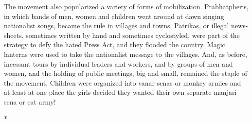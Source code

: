 The movement also popularized a variety of forms of mobilization. Prabhatpheris, in which bands of men, women and children went around at dawn singing nationalist songs, became the rule in villages and towns. Patrikas, or illegal news-sheets, sometimes written by hand and sometimes cyclostyled, were part of the strategy to defy the hated Press Act, and they flooded the country. Magic lanterns were used to take the nationalist message to the villages. And, as before, incessant tours by individual leaders and workers, and by groups of men and women, and the holding of public meetings, big and small, remained the staple of the movement. Children were organized into vanar senas or monkey armies and at least at one place the girls decided they wanted their own separate manjari sena or cat army!

\begin{center}*\end{center}

\paragraph*{}


